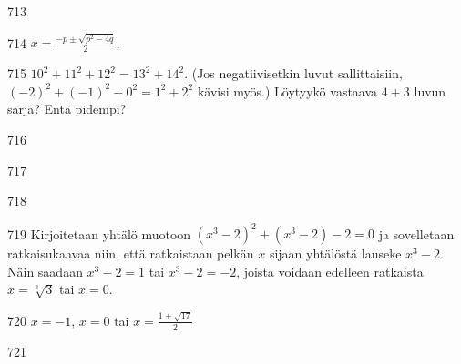 \begin{Vastaus}{713}
    
\end{Vastaus}
\begin{Vastaus}{714}
		$x=\frac{-p \pm \sqrt{p^2-4q}}{2}$.
	
\end{Vastaus}
\begin{Vastaus}{715}
		$10^2+11^2+12^2 = 13^2 + 14^2$.
    	(Jos negatiivisetkin luvut sallittaisiin, $(-2)^2+(-1)^2+0^2 = 1^2 + 2^2$ kävisi myös.) Löytyykö vastaava $4 + 3$ luvun sarja? Entä pidempi?
    
\end{Vastaus}
\begin{Vastaus}{716}
    
\end{Vastaus}
\begin{Vastaus}{717}
    
\end{Vastaus}
\begin{Vastaus}{718}
    
\end{Vastaus}
\begin{Vastaus}{719}
		Kirjoitetaan yhtälö muotoon $(x^3-2)^2+(x^3-2)-2=0$ ja sovelletaan ratkaisukaavaa niin, että ratkaistaan pelkän $x$ sijaan yhtälöstä lauseke $x^3-2$. Näin saadaan $x^3-2=1$ tai $x^3-2=-2$, joista voidaan edelleen ratkaista $x=\sqrt[3]{3}$ tai $x=0$.
	
\end{Vastaus}
\begin{Vastaus}{720}
		$x=-1$, $x=0$ tai $x=\frac{1 \pm \sqrt{17}}{2}$
	
\end{Vastaus}
\begin{Vastaus}{721}
	
\end{Vastaus}
